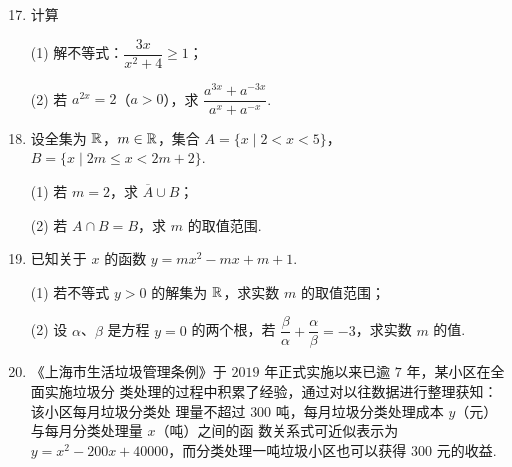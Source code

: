 \documentclass[a4paper,11pt]{article}
\begin{document}
\begin{enumerate}
\setcounter{enumi}{16}

\item 计算

(1) 解不等式：$\dfrac{3x}{x^2+4}\geq1$；

(2) 若 $a^{2x}=2$（$a>0$），求 $\dfrac{a^{3x}+a^{-3x}}{a^x+a^{-x}}$.

\ifanswer
\solbegin
{}
\solend
\fi

\item 设全集为 $\mathbb{R}$，$m\in\mathbb{R}$，集合 $A=\{x\mid2<x<5\}$，$B=\{x\mid2m\leq x<2m+2\}$.

(1) 若 $m=2$，求 $\overline{A}\cup B$；

(2) 若 $A\cap B=B$，求 $m$ 的取值范围.

\ifanswer
\solbegin
\step{(1) $\overline{A}=(-\infty,2]\cup[5,+\infty)$，$B=[4,6)$，所以 $\overline{A}\cup B=(-\infty,2]\cup[4,+\infty)$.}
\step{(2) $A\cap B=B\Leftrightarrow B\subseteq A$，即 $[2m,2m+2)\subseteq(2,5)$，}
\solend
\fi

\item 已知关于 $x$ 的函数 $y=mx^2-mx+m+1$.

(1) 若不等式 $y>0$ 的解集为 $\mathbb{R}$，求实数 $m$ 的取值范围；

(2) 设 $\alpha$、$\beta$ 是方程 $y=0$ 的两个根，若 $\dfrac\beta\alpha+\dfrac\alpha\beta=-3$，求实数 $m$ 的值.

\ifanswer
\solbegin
{}
\step{$m>0$ 时，$y=m\left(x-\dfrac12\right)^2+\dfrac{3m}4+1>0$，因此 $m\in[0,+\infty)$.}
\solend
\fi

\item 《上海市生活垃圾管理条例》于 $2019$ 年正式实施以来已逾 $7$ 年，某小区在全面实施垃圾分
类处理的过程中积累了经验，通过对以往数据进行整理获知：该小区每月垃圾分类处
理量不超过 $300$ 吨，每月垃圾分类处理成本 $y$（元）与每月分类处理量 $x$（吨）之间的函
数关系式可近似表示为 $y=x^2-200x+40000$，而分类处理一吨垃圾小区也可以获得 $300$
元的收益.


\end{enumerate}
\end{document}
